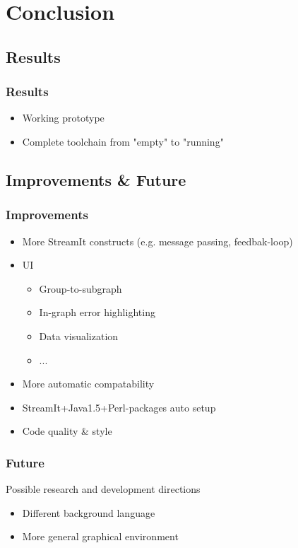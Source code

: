 \documentclass{beamer}
\begin{document}
\section{Conclusion}

\subsection{Results}
\begin{frame}
\frametitle{Results}
	\begin{itemize}
		\item Working prototype
		\item Complete toolchain from "empty" to "running"
	\end{itemize}
\end{frame}

\subsection{Improvements \& Future}
\begin{frame}
\frametitle{Improvements}
	\begin{itemize}
		\item More StreamIt constructs (e.g. message passing, feedbak-loop)
		\item UI
		\begin{itemize}
			\item Group-to-subgraph
			\item In-graph error highlighting
			\item Data visualization
			\item ...
		\end{itemize}
		\item More automatic compatability
		\item StreamIt+Java1.5+Perl-packages auto setup
		\item Code quality \& style
	\end{itemize}
\end{frame}

\begin{frame}
\frametitle{Future}
Possible research and development directions
	\begin{itemize}
		\item Different background language
		\item More general graphical environment
	\end{itemize}
\end{frame}
\end{document}
